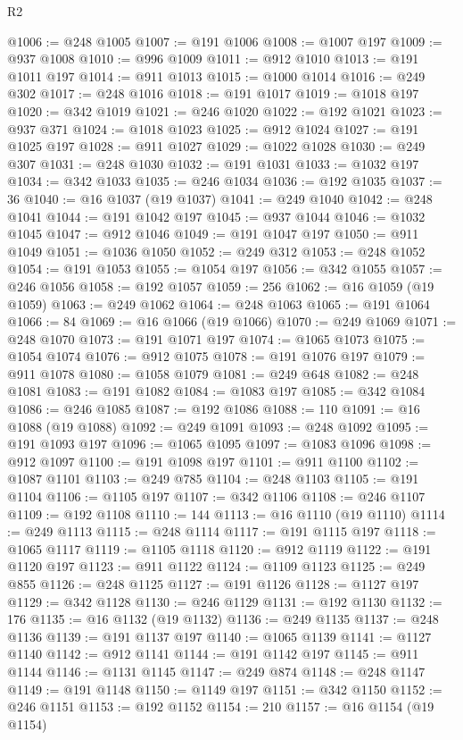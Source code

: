 \begin{lexlean}{R2}
\begin{coremodule}
@1006 := @248 @1005
@1007 := @191 @1006
@1008 := @1007 @197
@1009 := @937 @1008
@1010 := @996 @1009
@1011 := @912 @1010
@1013 := @191 @1011 @197
@1014 := @911 @1013
@1015 := @1000 @1014
@1016 := @249 @302
@1017 := @248 @1016
@1018 := @191 @1017
@1019 := @1018 @197
@1020 := @342 @1019
@1021 := @246 @1020
@1022 := @192 @1021
@1023 := @937 @371
@1024 := @1018 @1023
@1025 := @912 @1024
@1027 := @191 @1025 @197
@1028 := @911 @1027
@1029 := @1022 @1028
@1030 := @249 @307
@1031 := @248 @1030
@1032 := @191 @1031
@1033 := @1032 @197
@1034 := @342 @1033
@1035 := @246 @1034
@1036 := @192 @1035
@1037 := 36
@1040 := @16 @1037 (@19 @1037)
@1041 := @249 @1040
@1042 := @248 @1041
@1044 := @191 @1042 @197
@1045 := @937 @1044
@1046 := @1032 @1045
@1047 := @912 @1046
@1049 := @191 @1047 @197
@1050 := @911 @1049
@1051 := @1036 @1050
@1052 := @249 @312
@1053 := @248 @1052
@1054 := @191 @1053
@1055 := @1054 @197
@1056 := @342 @1055
@1057 := @246 @1056
@1058 := @192 @1057
@1059 := 256
@1062 := @16 @1059 (@19 @1059)
@1063 := @249 @1062
@1064 := @248 @1063
@1065 := @191 @1064
@1066 := 84
@1069 := @16 @1066 (@19 @1066)
@1070 := @249 @1069
@1071 := @248 @1070
@1073 := @191 @1071 @197
@1074 := @1065 @1073
@1075 := @1054 @1074
@1076 := @912 @1075
@1078 := @191 @1076 @197
@1079 := @911 @1078
@1080 := @1058 @1079
@1081 := @249 @648
@1082 := @248 @1081
@1083 := @191 @1082
@1084 := @1083 @197
@1085 := @342 @1084
@1086 := @246 @1085
@1087 := @192 @1086
@1088 := 110
@1091 := @16 @1088 (@19 @1088)
@1092 := @249 @1091
@1093 := @248 @1092
@1095 := @191 @1093 @197
@1096 := @1065 @1095
@1097 := @1083 @1096
@1098 := @912 @1097
@1100 := @191 @1098 @197
@1101 := @911 @1100
@1102 := @1087 @1101
@1103 := @249 @785
@1104 := @248 @1103
@1105 := @191 @1104
@1106 := @1105 @197
@1107 := @342 @1106
@1108 := @246 @1107
@1109 := @192 @1108
@1110 := 144
@1113 := @16 @1110 (@19 @1110)
@1114 := @249 @1113
@1115 := @248 @1114
@1117 := @191 @1115 @197
@1118 := @1065 @1117
@1119 := @1105 @1118
@1120 := @912 @1119
@1122 := @191 @1120 @197
@1123 := @911 @1122
@1124 := @1109 @1123
@1125 := @249 @855
@1126 := @248 @1125
@1127 := @191 @1126
@1128 := @1127 @197
@1129 := @342 @1128
@1130 := @246 @1129
@1131 := @192 @1130
@1132 := 176
@1135 := @16 @1132 (@19 @1132)
@1136 := @249 @1135
@1137 := @248 @1136
@1139 := @191 @1137 @197
@1140 := @1065 @1139
@1141 := @1127 @1140
@1142 := @912 @1141
@1144 := @191 @1142 @197
@1145 := @911 @1144
@1146 := @1131 @1145
@1147 := @249 @874
@1148 := @248 @1147
@1149 := @191 @1148
@1150 := @1149 @197
@1151 := @342 @1150
@1152 := @246 @1151
@1153 := @192 @1152
@1154 := 210
@1157 := @16 @1154 (@19 @1154)

\end{coremodule}
\end{lexlean}
